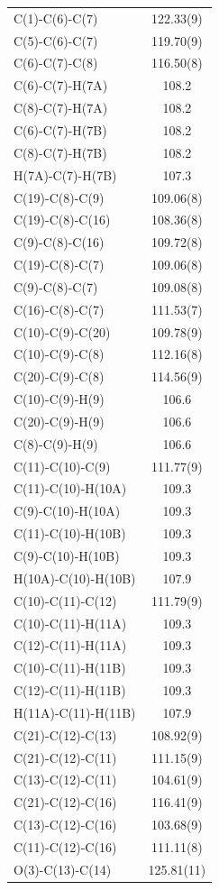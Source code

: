 \begin{center}
{\begin{supertabular}{p{1.5in}c}
C(1)-C(6)-C(7)&122.33(9)\\
C(5)-C(6)-C(7)&119.70(9)\\
C(6)-C(7)-C(8)&116.50(8)\\
C(6)-C(7)-H(7A)&108.2\\
C(8)-C(7)-H(7A)&108.2\\
C(6)-C(7)-H(7B)&108.2\\
C(8)-C(7)-H(7B)&108.2\\
H(7A)-C(7)-H(7B)&107.3\\
C(19)-C(8)-C(9)&109.06(8)\\
C(19)-C(8)-C(16)&108.36(8)\\
C(9)-C(8)-C(16)&109.72(8)\\
C(19)-C(8)-C(7)&109.06(8)\\
C(9)-C(8)-C(7)&109.08(8)\\
C(16)-C(8)-C(7)&111.53(7)\\
C(10)-C(9)-C(20)&109.78(9)\\
C(10)-C(9)-C(8)&112.16(8)\\
C(20)-C(9)-C(8)&114.56(9)\\
C(10)-C(9)-H(9)&106.6\\
C(20)-C(9)-H(9)&106.6\\
C(8)-C(9)-H(9)&106.6\\
C(11)-C(10)-C(9)&111.77(9)\\
C(11)-C(10)-H(10A)&109.3\\
C(9)-C(10)-H(10A)&109.3\\
C(11)-C(10)-H(10B)&109.3\\
C(9)-C(10)-H(10B)&109.3\\
H(10A)-C(10)-H(10B)&107.9\\
C(10)-C(11)-C(12)&111.79(9)\\
C(10)-C(11)-H(11A)&109.3\\
C(12)-C(11)-H(11A)&109.3\\
C(10)-C(11)-H(11B)&109.3\\
C(12)-C(11)-H(11B)&109.3\\
H(11A)-C(11)-H(11B)&107.9\\
C(21)-C(12)-C(13)&108.92(9)\\
C(21)-C(12)-C(11)&111.15(9)\\
C(13)-C(12)-C(11)&104.61(9)\\
C(21)-C(12)-C(16)&116.41(9)\\
C(13)-C(12)-C(16)&103.68(9)\\
C(11)-C(12)-C(16)&111.11(8)\\
O(3)-C(13)-C(14)&125.81(11)\\

\end{supertabular}}
\end{center}
